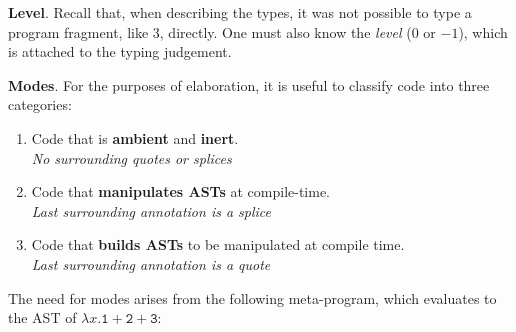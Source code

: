 \textbf{Level}. Recall that, when describing the \efflang{} types, it was not possible to type a program fragment, like \textsf{3}, directly. One must also know the \textit{level} ($0$ or $-1$), which is attached to the typing judgement.

\textbf{Modes}. For the purposes of elaboration, it is useful to classify code into three categories:

\begin{enumerate}
  \item[\compilemode] Code that is \textcolor{compile}{\textbf{ambient}} and \textcolor{compile}{\textbf{inert}}.\\
  \textit{No surrounding quotes or splices}
  \item[\splicemode] Code that \textcolor{splice}{\textbf{manipulates ASTs}} at compile-time. \\
  \textit{Last surrounding annotation is a splice}
  \item[\quotemode] Code that \textcolor{quote}{\textbf{builds ASTs}} to be manipulated at compile time. \\
  \textit{Last surrounding annotation is a quote}
\end{enumerate}

The need for modes arises from the following meta-program, which evaluates to the AST of $\lambda x. \texttt{1}+\texttt{2}+\texttt{3}$:

